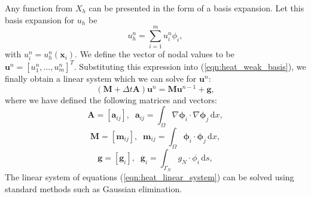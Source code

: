 Any function from $X_{h}$ can be presented in the form of a basis expansion. Let this basis expansion for $u_{h}$ be
\begin{equation*}
u_{h}^{n}=\sum^{m}_{i=1} u_{i}^{n}\phi_{i},
\end{equation*}
with $u_{i}^{n}=u_{h}^{n}(\mathbf{x}_{i})$. We define the vector of nodal values to be $\mathbf{u}^{n} = \left[u_{1}^{n},...,u_{m}^{n} \right]^{T}$. Substituting this expression into (\ref{eqn:heat_weak_basis}), we finally obtain a linear system which we can solve for $\mathbf{u}^{n}$:
\begin{equation}
(\mathbf{M}+\Delta t \mathbf{A})\mathbf{u}^{n}=\mathbf{M}\mathbf{u}^{n-1} + \mathbf{g},
\label{eqn:heat_linear_system}
\end{equation}
 where we have defined the following matrices and vectors:
 \begin{equation*}
  \mathbf{A}=[\mathbf{a}_{ij}], \;\; \mathbf{a}_{ij}=\int_{\Omega} \nabla \mathbf{\phi}_{i} \cdot \nabla\mathbf{\phi}_{j}\,\mbox{d}x,
 \end{equation*}
 \begin{equation*}
  \mathbf{M}=[\mathbf{m}_{ij}], \;\; \mathbf{m}_{ij}=\int_{\Omega}  \mathbf{\phi}_{i} \cdot \mathbf{\phi}_{j}\,\mbox{d}x, 
 \end{equation*}
  \begin{equation*}
  \mathbf{g}=[\mathbf{g}_{i}], \;\; \mathbf{g}_{i}=\int_{\Gamma_{N}}{{g}_{N}} \cdot {\phi}_{i}\,\mbox{d}s, 
 \end{equation*}
%
The linear system of equations (\ref{eqn:heat_linear_system}) can be solved using standard methods such as Gaussian elimination.







